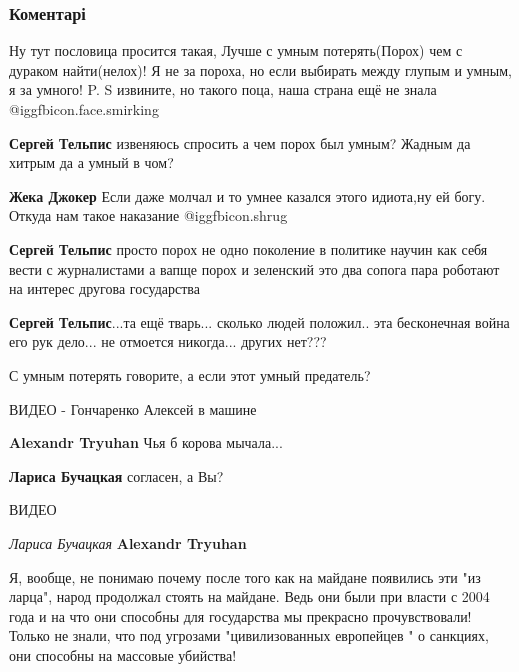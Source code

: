  
 
 
 
 
\subsubsection{Коментарі}

\begin{itemize} %

Ну тут пословица просится такая, Лучше с умным потерять(Порох) чем с дураком
найти(нелох)! Я не за пороха, но если выбирать между глупым и умным, я за умного!
P. S извините, но такого поца, наша страна ещё не знала @igg{fbicon.face.smirking} 

\begin{itemize} %
\textbf{Сергей Тельпис} извеняюсь спросить а чем порох был умным? Жадным да хитрым да а умный в чом?

\textbf{Жека Джокер} Если даже молчал и то умнее казался этого идиота,ну ей богу. Откуда нам такое наказание @igg{fbicon.shrug} 

\textbf{Сергей Тельпис} просто порох не одно поколение в политике научин как себя вести с журналистами а вапще порох и зеленский это два сопога пара роботают на интерес другова государства

\textbf{Сергей Тельпис}...та ещё тварь... сколько людей положил.. эта бесконечная война его рук дело... не отмоется никогда... других нет???

С умным потерять говорите, а если этот умный предатель?

ВИДЕО - Гончаренко Алексей в машине

\textbf{Alexandr Tryuhan}
Чья б корова мычала...

\textbf{Лариса Бучацкая} согласен, а Вы?

ВИДЕО

\emph{Лариса Бучацкая}
\textbf{Alexandr Tryuhan}

Я, вообще, не понимаю почему после того как на майдане появились эти "из
ларца", народ продолжал стоять на майдане. Ведь они были при власти с 2004 года
и на что они способны для государства мы прекрасно прочувствовали! Только не
знали, что под угрозами "цивилизованных европейцев " о санкциях, они способны
на массовые убийства!



\end{itemize}
\end{itemize}
